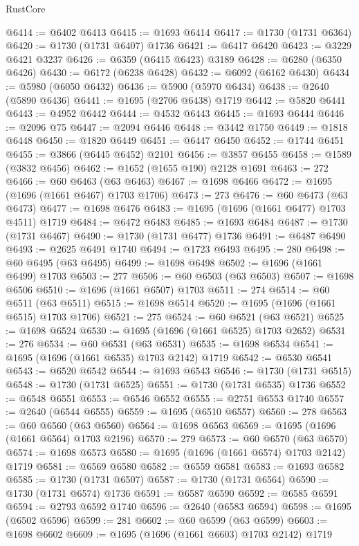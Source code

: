 \begin{lexlean}{RustCore}
\begin{coremodule}
@6414 := @6402 @6413
@6415 := @1693 @6414
@6417 := @1730 (@1731 @6364)
@6420 := @1730 (@1731 @6407) @1736
@6421 := @6417 @6420
@6423 := @3229 @6421 @3237
@6426 := @6359 (@6415 @6423) @3189
@6428 := @6280 (@6350 @6426)
@6430 := @6172 (@6238 @6428)
@6432 := @6092 (@6162 @6430)
@6434 := @5980 (@6050 @6432)
@6436 := @5900 (@5970 @6434)
@6438 := @2640 (@5890 @6436)
@6441 := @1695 (@2706 @6438) @1719
@6442 := @5820 @6441
@6443 := @4952 @6442
@6444 := @4532 @6443
@6445 := @1693 @6444
@6446 := @2096 @75
@6447 := @2094 @6446
@6448 := @3442 @1750
@6449 := @1818 @6448
@6450 := @1820 @6449
@6451 := @6447 @6450
@6452 := @1744 @6451
@6455 := @3866 (@6445 @6452) @2101
@6456 := @3857 @6455
@6458 := @1589 (@3832 @6456)
@6462 := @1652 (@1655 @190) @2128 @1691
@6463 := 272
@6466 := @60 @6463 (@63 @6463)
@6467 := @1698 @6466
@6472 := @1695 (@1696 (@1661 @6467) @1703 @1706)
@6473 := 273
@6476 := @60 @6473 (@63 @6473)
@6477 := @1698 @6476
@6483 := @1695 (@1696 (@1661 @6477) @1703 @4511) @1719
@6484 := @6472 @6483
@6485 := @1693 @6484
@6487 := @1730 (@1731 @6467)
@6490 := @1730 (@1731 @6477) @1736
@6491 := @6487 @6490
@6493 := @2625 @6491 @1740
@6494 := @1723 @6493
@6495 := 280
@6498 := @60 @6495 (@63 @6495)
@6499 := @1698 @6498
@6502 := @1696 (@1661 @6499) @1703
@6503 := 277
@6506 := @60 @6503 (@63 @6503)
@6507 := @1698 @6506
@6510 := @1696 (@1661 @6507) @1703
@6511 := 274
@6514 := @60 @6511 (@63 @6511)
@6515 := @1698 @6514
@6520 := @1695 (@1696 (@1661 @6515) @1703 @1706)
@6521 := 275
@6524 := @60 @6521 (@63 @6521)
@6525 := @1698 @6524
@6530 := @1695 (@1696 (@1661 @6525) @1703 @2652)
@6531 := 276
@6534 := @60 @6531 (@63 @6531)
@6535 := @1698 @6534
@6541 := @1695 (@1696 (@1661 @6535) @1703 @2142) @1719
@6542 := @6530 @6541
@6543 := @6520 @6542
@6544 := @1693 @6543
@6546 := @1730 (@1731 @6515)
@6548 := @1730 (@1731 @6525)
@6551 := @1730 (@1731 @6535) @1736
@6552 := @6548 @6551
@6553 := @6546 @6552
@6555 := @2751 @6553 @1740
@6557 := @2640 (@6544 @6555)
@6559 := @1695 (@6510 @6557)
@6560 := 278
@6563 := @60 @6560 (@63 @6560)
@6564 := @1698 @6563
@6569 := @1695 (@1696 (@1661 @6564) @1703 @2196)
@6570 := 279
@6573 := @60 @6570 (@63 @6570)
@6574 := @1698 @6573
@6580 := @1695 (@1696 (@1661 @6574) @1703 @2142) @1719
@6581 := @6569 @6580
@6582 := @6559 @6581
@6583 := @1693 @6582
@6585 := @1730 (@1731 @6507)
@6587 := @1730 (@1731 @6564)
@6590 := @1730 (@1731 @6574) @1736
@6591 := @6587 @6590
@6592 := @6585 @6591
@6594 := @2793 @6592 @1740
@6596 := @2640 (@6583 @6594)
@6598 := @1695 (@6502 @6596)
@6599 := 281
@6602 := @60 @6599 (@63 @6599)
@6603 := @1698 @6602
@6609 := @1695 (@1696 (@1661 @6603) @1703 @2142) @1719

\end{coremodule}
\end{lexlean}
